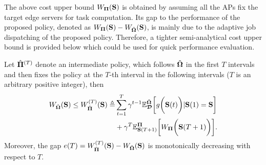 The above cost upper bound $W_{\mathbf{\Pi}}(\mathbf{S})$ is obtained by assuming all the APs fix the target edge servers for task computation.
Its gap to the performance of the proposed policy, denoted as $W_{\mathbf{\Pi}}(\mathbf{S}) - W_{\tilde{\boldsymbol{\Omega}}}(\mathbf{S})$, is mainly due to the adaptive job dispatching of the proposed policy.
Therefore, a tighter semi-analytical cost upper bound is provided below which could be used for quick performance evaluation.
\begin{lemma}
    Let $\hat{\mathbf{\Pi}}^{(T)}$ denote an intermediate policy, which follows $\tilde{\boldsymbol{\Omega}}$ in the first $T$ intervals and then fixes the policy at the $T$-th interval in the following intervals ($T$ is an arbitrary positive integer), then
    \begin{align}
        W_{\tilde{\boldsymbol{\Omega}}}(\mathbf{S}) \leq W_{\hat{\mathbf{\Pi}}}^{(T)}(\mathbf{S})
        \triangleq &\sum_{t=1}^{T} \gamma^{t-1} \mathbb{E}^{\tilde{\boldsymbol{\Omega}}}_{\boldsymbol{\mathcal{D}}}\bigg[g\bigg(\mathbf{S}(t)\bigg) | \mathbf{S}(1)=\mathbf{S}\bigg]
        \nonumber\\
        &+\gamma^{T} \mathbb{E}^{\mathbf{\Pi}}_{\mathbf{S}(T+1)}\bigg[W_{\mathbf{\Pi}}\bigg(\mathbf{S}(T+1)\bigg)\bigg].
        \label{eqn:semi-bound}
    \end{align}
    Moreover, the gap $e(T) = W^{(T)}_{\hat{\mathbf{\Pi}}}(\mathbf{S}) - W_{\tilde{\boldsymbol{\Omega}}}(\mathbf{S})$ is monotonically decreasing with respect to $T$.
\end{lemma}

